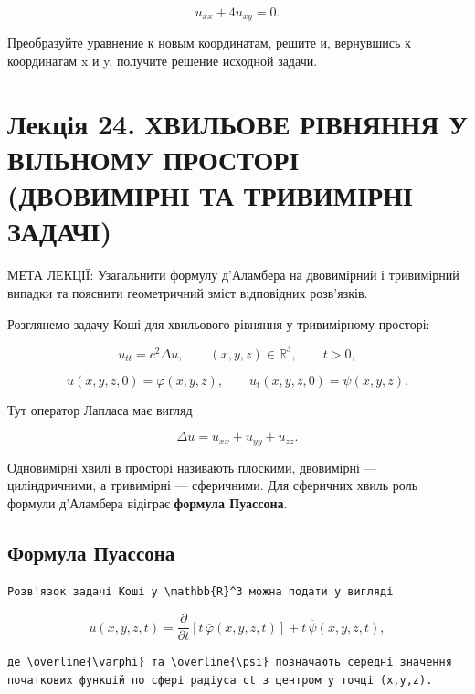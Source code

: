 \documentclass[
  ukrainian,
]{article}
\begin{document}
\[
u_{xx} + 4u_{xy} = 0.
\]

Преобразуйте уравнение к новым координатам, решите и, вернувшись к
координатам x и y, получите решение исходной задачи.

\section{Лекція 24. ХВИЛЬОВЕ РІВНЯННЯ У ВІЛЬНОМУ ПРОСТОРІ (ДВОВИМІРНІ ТА
ТРИВИМІРНІ
ЗАДАЧІ)}\label{ux43bux435ux43aux446ux456ux44f-24.-ux445ux432ux438ux43bux44cux43eux432ux435-ux440ux456ux432ux43dux44fux43dux43dux44f-ux443-ux432ux456ux43bux44cux43dux43eux43cux443-ux43fux440ux43eux441ux442ux43eux440ux456-ux434ux432ux43eux432ux438ux43cux456ux440ux43dux456-ux442ux430-ux442ux440ux438ux432ux438ux43cux456ux440ux43dux456-ux437ux430ux434ux430ux447ux456}

МЕТА ЛЕКЦІЇ: Узагальнити формулу д'Аламбера на двовимірний і тривимірний
випадки та пояснити геометричний зміст відповідних розв'язків.

Розглянемо задачу Коші для хвильового рівняння у тривимірному просторі:

\[
u_{tt}=c^2\Delta u,
\qquad
(x,y,z)\in\mathbb{R}^3,
\qquad
t>0,
\]

\[
u(x,y,z,0)=\varphi(x,y,z),
\qquad
u_t(x,y,z,0)=\psi(x,y,z).
\]

Тут оператор Лапласа має вигляд

\[
\Delta u=u_{xx}+u_{yy}+u_{zz}.
\]

Одновимірні хвилі в просторі називають плоскими, двовимірні ---
циліндричними, а тривимірні --- сферичними. Для сферичних хвиль роль
формули д'Аламбера відіграє \textbf{формула Пуассона}.

\subsection{Формула
Пуассона}\label{ux444ux43eux440ux43cux443ux43bux430-ux43fux443ux430ux441ux441ux43eux43dux430}

\begin{verbatim}
Розв'язок задачі Коші у \mathbb{R}^3 можна подати у вигляді
\end{verbatim}

\[
u(x,y,z,t)=\frac{\partial}{\partial t}\!\left[t\,\overline{\varphi}(x,y,z,t)\right]+t\,\overline{\psi}(x,y,z,t),
\]

\begin{verbatim}
де \overline{\varphi} та \overline{\psi} позначають середні значення початкових функцій по сфері радіуса ct з центром у точці (x,y,z).
\end{verbatim}
\end{document}
